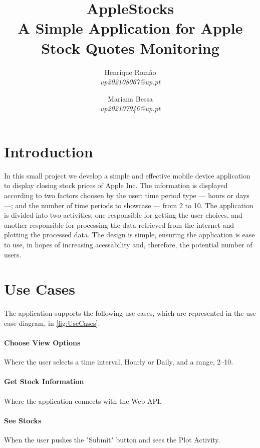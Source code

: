 \documentclass{article}
\title{\Huge \textbf{AppleStocks}\\\vspace{0.2em} \Large A Simple Application for Apple Stock Quotes Monitoring}
\author{
    Henrique Romão \\ 
    \textit{up202108067@up.pt} 
    \and 
    Mariana Bessa \\ 
    \textit{up202107946@up.pt}
}
\begin{document}
\maketitle

\hfill

\tableofcontents

\hfill

\newpage

\section{Introduction}
In this small project we develop a simple and effective mobile device application to display closing stock prices of Apple Inc.
The information is displayed according to two factors choosen by the user: time period type — hours or days —; and the number of time periods to showcase — from 2 to 10.
The application is divided into two activities, one responsible for getting the user choices, and another responsible for processing the data retrieved from the internet and plotting the processed data.
The design is simple, ensuring the application is ease to use, in hopes of increasing acessability and, therefore, the potential number of users.

\section{Use Cases}
The application supports the following use cases, which are represented in the use case diagram, in \autoref{fig:UseCases}.

\paragraph{Choose View Options}
Where the user selects a time interval, Hourly or Daily, and a range, 2–10.
\vspace{-0.5em}

\paragraph{Get Stock Information}
Where the application connects with the Web API.
\vspace{-0.5em}

\paragraph{See Stocks}
When the user pushes the "Submit" button and sees the Plot Activity.
\vspace{-0.5em}
\end{document}
